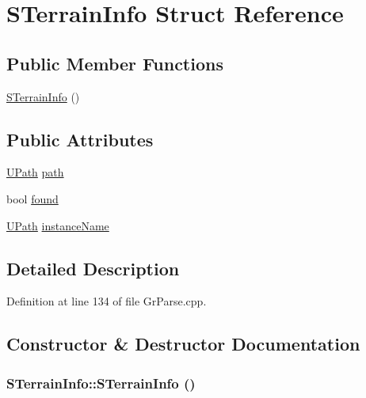 \hypertarget{struct_s_terrain_info}{
\section{STerrainInfo Struct Reference}
\label{struct_s_terrain_info}
}
\subsection*{Public Member Functions}
\begin{CompactItemize}
\item 
\hyperlink{struct_s_terrain_info_9e7e55094c75e31926126897bfa2a9a7}{STerrainInfo} ()
\end{CompactItemize}
\subsection*{Public Attributes}
\begin{CompactItemize}
\item 
\hyperlink{class_u_path}{UPath} \hyperlink{struct_s_terrain_info_9486e3c92a348c875916be85672b06f2}{path}
\item 
bool \hyperlink{struct_s_terrain_info_02668db2830c7bb2d6afe5875ea182e9}{found}
\item 
\hyperlink{class_u_path}{UPath} \hyperlink{struct_s_terrain_info_a372741e19a5bb43394c1fe36e0c55f8}{instanceName}
\end{CompactItemize}


\subsection{Detailed Description}


Definition at line 134 of file GrParse.cpp.

\subsection{Constructor \& Destructor Documentation}
\hypertarget{struct_s_terrain_info_9e7e55094c75e31926126897bfa2a9a7}{
\subsubsection[{STerrainInfo}]{\setlength{\rightskip}{0pt plus 5cm}STerrainInfo::STerrainInfo ()}}
\label{struct_s_terrain_info_9e7e55094c75e31926126897bfa2a9a7}




